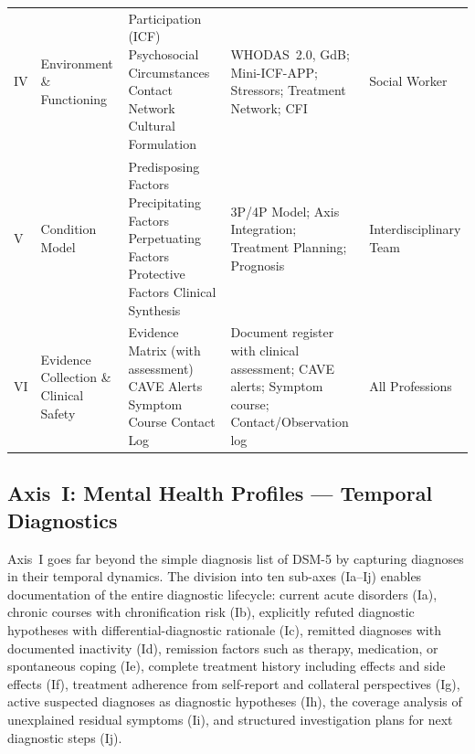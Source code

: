 \documentclass[11pt,a4paper]{article}
\begin{document}
\begin{table}[H]
\begin{tabularx}{\textwidth}{@{}L{0.8cm}L{2.1cm}L{3.3cm}Y L{2.2cm}@{}}
\addlinespace
IV & Environment \& Functioning & Participation (ICF) \newline Psychosocial Circumstances \newline Contact Network \newline Cultural Formulation & WHODAS~2.0, GdB; Mini-ICF-APP; Stressors; Treatment Network; CFI & Social Worker \\
\addlinespace
V & Condition Model & Predisposing Factors \newline Precipitating Factors \newline Perpetuating Factors \newline Protective Factors \newline Clinical Synthesis & 3P/4P Model; Axis Integration; Treatment Planning; Prognosis & Interdisciplinary Team \\
\addlinespace
VI & Evidence Collection \& Clinical Safety & Evidence Matrix (with assessment) \newline CAVE Alerts \newline Symptom Course \newline Contact Log & Document register with clinical assessment; CAVE alerts; Symptom course; Contact/Observation log & All Professions \\
\bottomrule
\end{tabularx}
\normalsize
\end{table}

\subsection{Axis~I: Mental Health Profiles --- Temporal Diagnostics}
\label{sec:axis1}

Axis~I goes far beyond the simple diagnosis list of DSM-5 by capturing diagnoses in their temporal dynamics. The division into ten sub-axes (Ia--Ij) enables documentation of the entire diagnostic lifecycle: current acute disorders (Ia), chronic courses with chronification risk (Ib), explicitly refuted diagnostic hypotheses with differential-diagnostic rationale (Ic), remitted diagnoses with documented inactivity (Id), remission factors such as therapy, medication, or spontaneous coping (Ie), complete treatment history including effects and side effects (If), treatment adherence from self-report and collateral perspectives (Ig), active suspected diagnoses as diagnostic hypotheses (Ih), the coverage analysis of unexplained residual symptoms (Ii), and structured investigation plans for next diagnostic steps (Ij).
\end{document}
